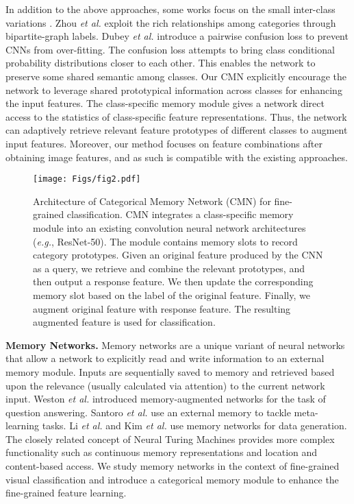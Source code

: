 \documentclass[journal]{IEEEtran}
\begin{document}
In addition to the above approaches, some works focus on the small inter-class variations \cite{dubey2018pairwise,dubey2018maximum,zhou2016fine}. Zhou \emph{et al.} \cite{zhou2016fine} exploit the rich relationships among categories through bipartite-graph labels. Dubey \emph{et al.} \cite{dubey2018pairwise} introduce a pairwise confusion loss to prevent CNNs from over-fitting. 
The confusion loss attempts to bring class conditional probability distributions closer to each other. This enables the network to preserve some shared semantic among classes. 
Our CMN explicitly encourage the network to leverage shared prototypical information across classes for enhancing the input features. The class-specific memory module gives a network direct access to the statistics of class-specific feature representations. Thus, the network can adaptively retrieve relevant feature prototypes of different classes to augment input features. Moreover, our method focuses on feature combinations after obtaining image features, and as such is compatible with the existing approaches.

\begin{figure*}[t]
\begin{center}
\texttt{[image: Figs/fig2.pdf]}
\end{center}
\caption{Architecture of Categorical Memory Network (CMN) for fine-grained classification. CMN integrates a class-specific memory module into an existing convolution neural network architectures (\emph{e.g.}, ResNet-50). The module contains memory slots to record category prototypes. Given an original feature produced by the CNN as a query, we retrieve and combine the relevant prototypes, and then output a response feature. We then update the corresponding memory slot based on the label of the original feature. Finally, we augment original feature with response feature. The resulting augmented feature is used for classification.}
\label{fig:framework}
\end{figure*}


\textbf{Memory Networks.}
Memory networks \cite{WestonCB14,sukhbaatar2015end,graves2016hybrid} are a unique variant of neural networks that allow a network to explicitly read and write information to an external memory module. Inputs are sequentially saved to memory and retrieved based upon the relevance (usually calculated via attention) to the current network input.
Weston \emph{et al.} \cite{WestonCB14} introduced memory-augmented networks for the task of question answering. Santoro \emph{et al.} \cite{santoro2016meta} use an external memory to tackle meta-learning tasks. Li \emph{et al.} \cite{li2016learning} and Kim \emph{et al.} \cite{kim2018memorization} use memory networks for data generation.
The closely related concept of Neural Turing Machines \cite{graves2014neural} provides more complex functionality such as continuous memory representations and location and content-based access. 
We study memory networks in the context of fine-grained visual classification and introduce a categorical memory module to enhance the fine-grained feature learning. 
\end{document}
